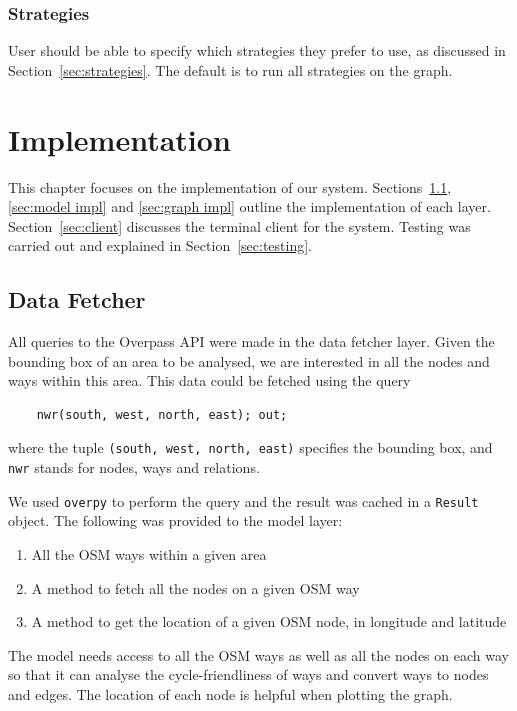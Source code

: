 \documentclass[12pt,a4paper]{report}
\begin{document}
\subsection{Strategies}
User should be able to specify which strategies they prefer to use, as discussed in Section~\ref{sec:strategies}. The default is to run all strategies on the graph.

\chapter{Implementation}\label{chapter:impl}
This chapter focuses on the implementation of our system. Sections~\ref{sec:data fetcher impl}, \ref{sec:model impl} and \ref{sec:graph impl} outline the implementation of each layer. Section~\ref{sec:client} discusses the terminal client for the system. Testing was carried out and explained in Section~\ref{sec:testing}.

\section{Data Fetcher}\label{sec:data fetcher impl}
All queries to the Overpass API were made in the data fetcher layer. Given the bounding box of an area to be analysed, we are interested in all the nodes and ways within this area. This data could be fetched using the query
\begin{verbatim}
    nwr(south, west, north, east); out;
\end{verbatim}
where the tuple \texttt{(south, west, north, east)} specifies the bounding box, and \texttt{nwr} stands for nodes, ways and relations.

We used \texttt{overpy} to perform the query and the result was cached in a \texttt{Result} object. The following was provided to the model layer:
\begin{enumerate}
    \item All the OSM ways within a given area
    \item A method to fetch all the nodes on a given OSM way
    \item A method to get the location of a given OSM node, in longitude and latitude
\end{enumerate}

The model needs access to all the OSM ways as well as all the nodes on each way so that it can analyse the cycle-friendliness of ways and convert ways to nodes and edges. The location of each node is helpful when plotting the graph.
\end{document}
